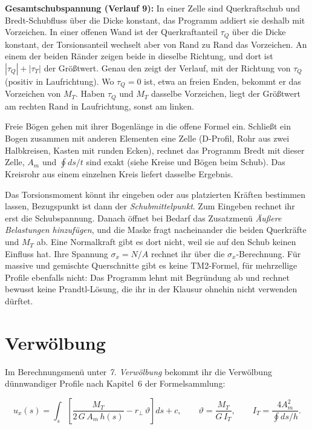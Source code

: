 \textbf{Gesamtschubspannung (Verlauf 9):} In einer Zelle sind Querkraftschub und Bredt-Schubfluss
über die Dicke konstant, das Programm addiert sie deshalb mit Vorzeichen. In einer offenen Wand ist
der Querkraftanteil $\tau_Q$ über die Dicke konstant, der Torsionsanteil wechselt aber von Rand zu
Rand das Vorzeichen. An einem der beiden Ränder zeigen beide in dieselbe Richtung, und dort ist
$|\tau_Q| + |\tau_T|$ der Größtwert. Genau den zeigt der Verlauf, mit der Richtung von $\tau_Q$
(positiv in Laufrichtung). Wo $\tau_Q = 0$ ist, etwa an freien Enden, bekommt er das Vorzeichen
von $M_T$. Haben $\tau_Q$ und $M_T$ dasselbe Vorzeichen, liegt der Größtwert am rechten Rand in
Laufrichtung, sonst am linken.

Freie Bögen gehen mit ihrer Bogenlänge in die offene Formel ein. Schließt ein Bogen zusammen mit
anderen Elementen eine Zelle (D-Profil, Rohr aus zwei Halbkreisen, Kasten mit runden Ecken),
rechnet das Programm Bredt mit dieser Zelle, $A_m$ und $\oint ds/t$ sind exakt (siehe Kreise und
Bögen beim Schub). Das Kreisrohr aus einem einzelnen Kreis liefert dasselbe Ergebnis.

Das Torsionsmoment könnt ihr eingeben oder aus platzierten Kräften bestimmen lassen, Bezugspunkt
ist dann der \emph{Schubmittelpunkt}. Zum Eingeben rechnet ihr erst die Schubspannung. Danach
öffnet bei Bedarf  das Zusatzmenü \emph{Äußere Belastungen hinzufügen}, und die Maske fragt
nacheinander die beiden Querkräfte und $M_T$ ab. Eine Normalkraft gibt es dort nicht, weil sie auf
den Schub keinen Einfluss hat. Ihre Spannung $\sigma_x = N/A$ rechnet ihr über die
$\sigma_x$-Berechnung. Für massive und gemischte Querschnitte gibt es keine
TM2-Formel, für mehrzellige Profile ebenfalls nicht: Das Programm lehnt mit Begründung ab und
rechnet bewusst keine Prandtl-Lösung, die ihr in der Klausur ohnehin nicht verwenden dürftet.

\section{Verwölbung}

Im Berechnungsmenü unter \emph{7. Verwölbung} bekommt ihr die Verwölbung dünnwandiger Profile
nach Kapitel~6 der Formelsammlung:

\[
  u_x(s) = \int_s \left[ \frac{M_T}{2\,G\,A_m\,h(s)} - r_\perp\,\vartheta \right] ds + c,
  \qquad \vartheta = \frac{M_T}{G\,I_T}, \qquad I_T = \frac{4A_m^2}{\oint ds/h}.
\]

